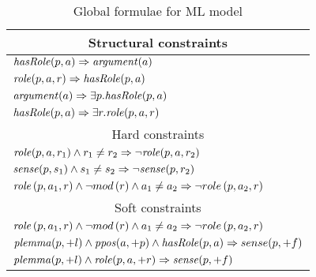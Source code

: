 \begin{table}[ht]
    \centering
    \small
    \begin{tabular}{|p{7.0cm}|}\hline
        \multicolumn{1}{|c|}{Structural constraints}\\\hline
       $\mathit{hasRole}(p,a) \Rightarrow \mathit{argument}(a)$\\
       $\mathit{role}(p,a,r) \Rightarrow \mathit{hasRole}(p,a)$\\\hline
       $\mathit{argument}(a)  \Rightarrow\exists p.\mathit{hasRole}(p,a)$\\
       $\mathit{hasRole}(p,a) \Rightarrow\exists r. \mathit{role}(p,a,r)$\\\hline
       \multicolumn{1}{|c|}{Hard constraints}\\\hline
       $\mathit{role}(p,a,r_1) \wedge r_1 \neq r_2 \Rightarrow \neg \mathit{role}(p,a,r_2)$\\
       $\mathit{sense}(p,s_1) \wedge s_1 \neq s_2 \Rightarrow \neg \mathit{sense}(p,r_2) $\\
       $\mathit{role}\left(p,a_{1},r\right)\wedge \neg mod\left(r\right)\wedge a_{1}\neq 
       a_{2}  \Rightarrow \neg role\left(p,a_{2},r\right) $ \\\hline
       \multicolumn{1}{|c|}{Soft constraints}\\\hline
       $\mathit{role}\left(p,a_{1},r\right)\wedge \neg mod\left(r\right)\wedge a_{1}\neq 
       a_{2}  \Rightarrow \neg role\left(p,a_{2},r\right) $ \\
       $ \mathit{plemma}(p,+l) \wedge \mathit{ppos}(a,+p) \wedge \mathit{hasRole}(p,a)  \Rightarrow 
       sense(p,+f) $ \\
       $ \mathit{plemma}(p,+l) \wedge \mathit{role}(p,a,+r) \Rightarrow \mathit{sense}(p,+f) $ \\
        \hline
    \end{tabular}
    \caption{Global formulae for ML model}
    \label{tbl:global}
\end{table}


